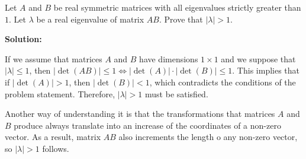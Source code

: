 \documentclass[../../main.tex]{subfiles}
\begin{document}
  \begin{shaded}
    Let $A$ and $B$ be real symmetric matrices with all eigenvalues strictly greater than $1$. Let $\lambda$ be a real eigenvalue of matrix $AB$. Prove that $|\lambda| > 1$.
  \end{shaded}

  \textbf{Solution:}

  If we assume that matrices $A$ and $B$ have dimensions $1 \times 1$ and we suppose that $|\lambda| \leq 1$, then $|\det{(AB)}| \leq 1 \iff |\det{(A)}| \cdot |\det{(B)}| \leq 1$. This implies that if $|\det{(A)}| > 1$, then $|\det{(B)}| < 1$, which contradicts the conditions of the problem statement. Therefore, $|\lambda| > 1$ must be satisfied.

  Another way of understanding it is that the transformations that matrices $A$ and $B$ produce always translate into an increase of the coordinates of a non-zero vector. As a result, matrix $AB$ also increments the length o any non-zero vector, so $|\lambda| > 1$ follows.
\end{document}
